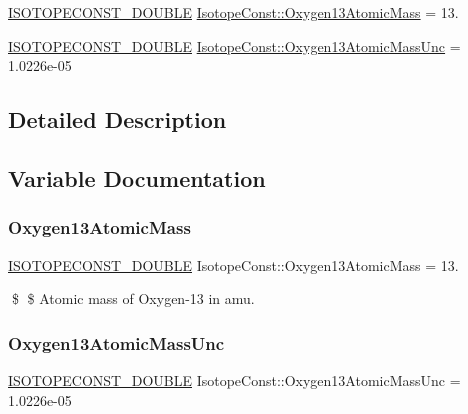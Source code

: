 \begin{DoxyCompactItemize}
\item 
\mbox{\hyperlink{group___isotope_const-_macros_ga8f45a7272ce02c0b4c65c44636ed719a}{I\+S\+O\+T\+O\+P\+E\+C\+O\+N\+S\+T\+\_\+\+D\+O\+U\+B\+LE}} \mbox{\hyperlink{group___isotope_const-_oxygen-_o13_gaba38f2e9918df9d93717ced762433004}{Isotope\+Const\+::\+Oxygen13\+Atomic\+Mass}} = 13.
\item 
\mbox{\hyperlink{group___isotope_const-_macros_ga8f45a7272ce02c0b4c65c44636ed719a}{I\+S\+O\+T\+O\+P\+E\+C\+O\+N\+S\+T\+\_\+\+D\+O\+U\+B\+LE}} \mbox{\hyperlink{group___isotope_const-_oxygen-_o13_ga9d4892f055ea2a735ae1cdadcffcf42f}{Isotope\+Const\+::\+Oxygen13\+Atomic\+Mass\+Unc}} = 1.\+0226e-\/05
\end{DoxyCompactItemize}


\subsection{Detailed Description}


\subsection{Variable Documentation}
\mbox{\label{group___isotope_const-_oxygen-_o13_gaba38f2e9918df9d93717ced762433004}} 
\subsubsection{\texorpdfstring{Oxygen13\+Atomic\+Mass}{Oxygen13AtomicMass}}
{\footnotesize\ttfamily \mbox{\hyperlink{group___isotope_const-_macros_ga8f45a7272ce02c0b4c65c44636ed719a}{I\+S\+O\+T\+O\+P\+E\+C\+O\+N\+S\+T\+\_\+\+D\+O\+U\+B\+LE}} Isotope\+Const\+::\+Oxygen13\+Atomic\+Mass = 13.}

\$ \$ Atomic mass of Oxygen-\/13 in amu. \mbox{\label{group___isotope_const-_oxygen-_o13_ga9d4892f055ea2a735ae1cdadcffcf42f}} 
\subsubsection{\texorpdfstring{Oxygen13\+Atomic\+Mass\+Unc}{Oxygen13AtomicMassUnc}}
{\footnotesize\ttfamily \mbox{\hyperlink{group___isotope_const-_macros_ga8f45a7272ce02c0b4c65c44636ed719a}{I\+S\+O\+T\+O\+P\+E\+C\+O\+N\+S\+T\+\_\+\+D\+O\+U\+B\+LE}} Isotope\+Const\+::\+Oxygen13\+Atomic\+Mass\+Unc = 1.\+0226e-\/05}

